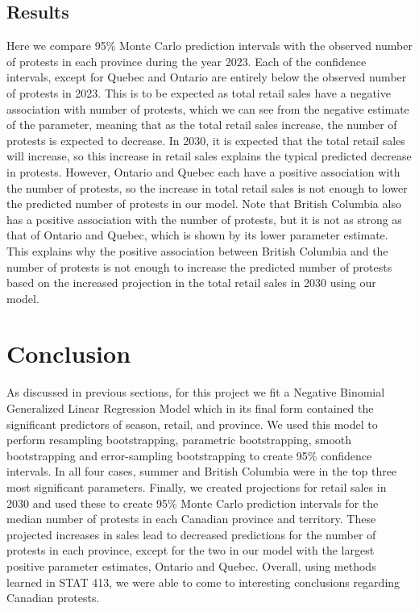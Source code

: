 \documentclass[12pt]{article}
\begin{document}
\subsection*{Results}
Here we compare 95\% Monte Carlo prediction intervals with the observed number of protests in each province during the year 2023. Each of the confidence intervals, except for Quebec and Ontario are entirely below the observed number of protests in 2023. This is to be expected as total retail sales have a negative association with number of protests, which we can see from the negative estimate of the parameter, meaning that as the total retail sales increase, the number of protests is expected to decrease. In 2030, it is expected that the total retail sales will increase, so this increase in retail sales explains the typical predicted decrease in protests. However, Ontario and Quebec each have a positive association with the number of protests, so the increase in total retail sales is not enough to lower the predicted number of protests in our model. Note that British Columbia also has a positive association with the number of protests, but it is not as strong as that of Ontario and Quebec, which is shown by its lower parameter estimate. This explains why the positive association between British Columbia and the number of protests is not enough to increase the predicted number of protests based on the increased projection in the total retail sales in 2030 using our model.

\newpage
\section{Conclusion}
As discussed in previous sections, for this project we fit a Negative Binomial Generalized Linear Regression Model which in its final form contained the significant predictors of season, retail, and province. We used this model to perform resampling bootstrapping, parametric bootstrapping, smooth bootstrapping and error-sampling bootstrapping to create 95\% confidence intervals. In all four cases, summer and British Columbia were in the top three most significant parameters.  Finally, we created projections for retail sales in 2030 and used these to create 95\% Monte Carlo prediction intervals for the median number of protests in each Canadian province and territory. These projected increases in sales lead to decreased predictions for the number of protests in each province, except for the two in our model with the largest positive parameter estimates, Ontario and Quebec.
Overall, using methods learned in STAT 413, we were able to come to interesting conclusions regarding Canadian protests.
\end{document}
